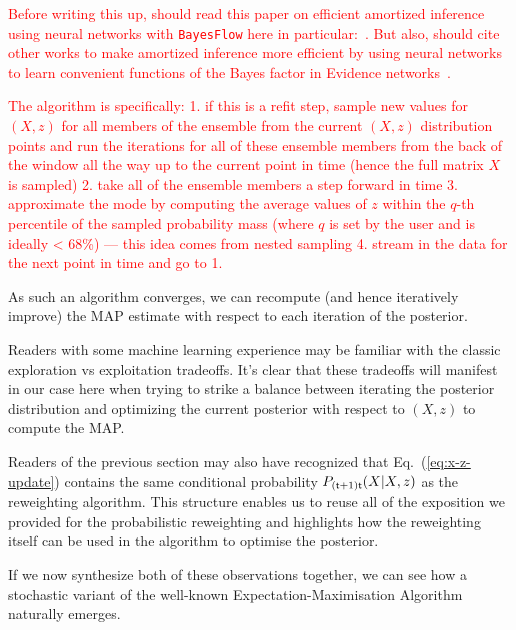 \textcolor{red}{
Before writing this up, should read this paper on efficient amortized inference using neural networks with \texttt{BayesFlow} here in particular:~\cite{radev2020bayesflow}. But also, should cite other works to make amortized inference more efficient by using neural networks to learn convenient functions of the Bayes factor in Evidence networks~\cite{jeffrey2023evidence}.
}


\textcolor{red}{The algorithm is specifically: 
1. if this is a refit step, sample new values for $(X,z)$ for all members of the ensemble from the current $(X,z)$ distribution points and run the iterations for all of these ensemble members from the back of the window all the way up to the current point in time (hence the full matrix $X$ is sampled)
2. take all of the ensemble members a step forward in time
3. approximate the mode by computing the average values of $z$ within the $q$-th percentile of the sampled probability mass (where $q$ is set by the user and is ideally < 68\%) --- this idea comes from nested sampling
4. stream in the data for the next point in time and go to 1.}


As such an algorithm converges, we can recompute (and hence iteratively improve) the MAP estimate with respect to each iteration of the posterior.

Readers with some machine learning experience may be familiar with the classic exploration vs exploitation tradeoffs. It's clear that these tradeoffs will manifest in our case here when trying to strike a balance between iterating the posterior distribution and optimizing the current posterior with respect to $(X,z)$ to compute the MAP. 

Readers of the previous section may also have recognized that Eq.~(\ref{eq:x-z-update}) contains the same conditional probability $P_{({\sf t}+1){\sf t}}(X\vert X,z)$ as the reweighting algorithm. This structure enables us to reuse all of the exposition we provided for the probabilistic reweighting and highlights how the reweighting itself can be used in the algorithm to optimise the posterior.   

If we now synthesize both of these observations together, we can see how a stochastic variant of the well-known Expectation-Maximisation Algorithm~\cite{hartley1958maximum, dempster1977maximum, murphy2012machine} naturally emerges.


